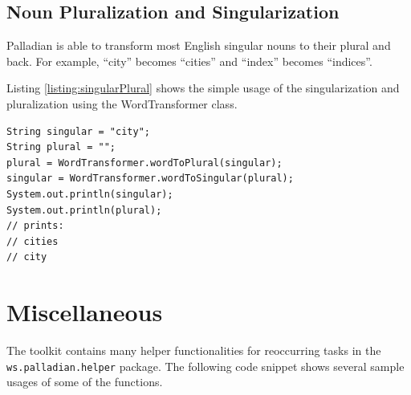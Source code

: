 \documentclass[a4paper,twoside]{book}      %
\begin{document}
\subsection{Noun Pluralization and Singularization}
Palladian is able to transform most English singular nouns to their plural and back. For example, ``city'' becomes ``cities'' and ``index'' becomes ``indices''.

Listing \ref{listing:singularPlural} shows the simple usage of the singularization and pluralization using the WordTransformer class.

\begin{codelisting}
\begin{lstlisting}[label=listing:singularPlural,caption=Transforming words from singular to plural and vice versa.,frame=tb]
String singular = "city";
String plural = "";
plural = WordTransformer.wordToPlural(singular);
singular = WordTransformer.wordToSingular(plural);
System.out.println(singular);
System.out.println(plural);
// prints:
// cities
// city
\end{lstlisting}
\end{codelisting}

\section{Miscellaneous}
The toolkit contains many helper functionalities for reoccurring tasks in the \texttt{ws.palladian.helper} package. The following code snippet shows several sample usages of some of the functions.
\end{document}

